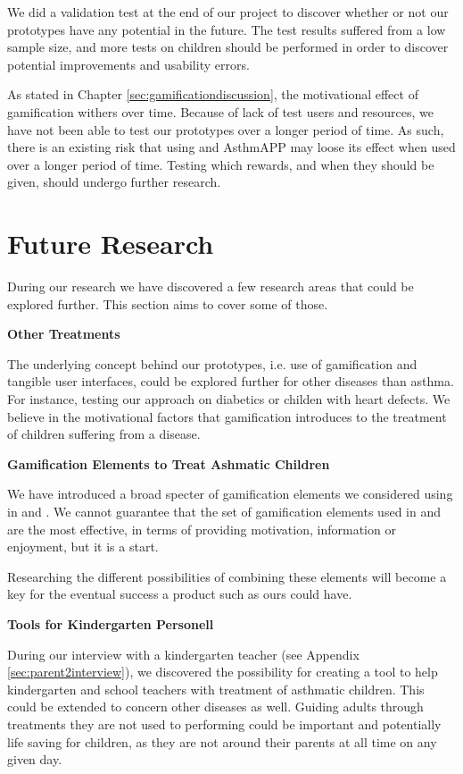 We did a validation test at the end of our project to discover whether or not our prototypes have any potential in the future. The test results suffered from a low sample size, and more tests on children should be performed in order to discover potential improvements and usability errors. 

As stated in Chapter \ref{sec:gamificationdiscussion}, the motivational effect of gamification withers over time. Because of lack of test users and resources, we have not been able to test our prototypes over a longer period of time. As such, there is an existing risk that using \buddy{} and AsthmAPP may loose its effect when used over a longer period of time. Testing which rewards, and when they should be given, should undergo further research.   

\section{Future Research}
\label{sec:futureresearch}

During our research we have discovered a few research areas that could be explored further. This section aims to cover some of those. 

\textbf{Other Treatments}

The underlying concept behind our prototypes, i.e. use of gamification and tangible user interfaces, could be explored further for other diseases than asthma. For instance, testing our approach on diabetics or childen with heart defects. We believe in the motivational factors that gamification introduces to the treatment of children suffering from a disease. 

\textbf{Gamification Elements to Treat Ashmatic Children}

We have introduced a broad specter of gamification elements we considered using in \app{} and \ab{}. We cannot guarantee that the set of gamification elements used in \app{} and \ab{} are the most effective, in terms of providing motivation, information or enjoyment, but it is a start. 

Researching the different possibilities of combining these elements will become a key for the eventual success a product such as ours could have.    


\textbf{Tools for Kindergarten Personell}

During our interview with a kindergarten teacher (see Appendix \ref{sec:parent2interview}), we discovered the possibility for creating a tool to help kindergarten and school teachers with treatment of asthmatic children. This could be extended to concern other diseases as well. Guiding adults through treatments they are not used to performing could be important and potentially life saving for children, as they are not around their parents at all time on any given day.    

